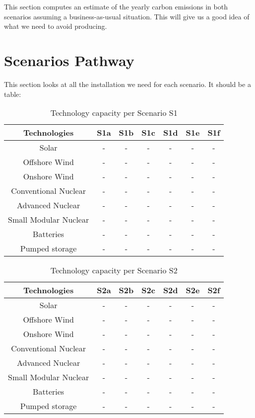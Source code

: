 This section computes an estimate of the yearly carbon emissions in both scenarios assuming a business-as-usual situation. This will give us a good idea of what we need to avoid producing.


\section{Scenarios Pathway}

This section looks at all the installation we need for each scenario. It should be a table:



\begin{table}[ht]
\caption[Technology capacity per Scenario S1]{Technology capacity per Scenario S1}
\begin{tabular}{ c c c c c c c }
	\toprule
	Technologies & S1a & S1b & S1c & S1d & S1e & S1f \\
	\midrule
	Solar & - & - & - & - & - & - \\
	Offshore Wind & - & - & - & - & - & - \\
	Onshore Wind & - & - & - & - & - & - \\
	Conventional Nuclear & - & - & - & - & - & - \\
	Advanced Nuclear & - & - & - & - & - & - \\
	Small Modular Nuclear & - & - & - & - & - & - \\
	Batteries & - & - & - & - & - & - \\
	Pumped storage & - & - & - & - & - & - \\
	\bottomrule
\end{tabular}
\end{table}


\begin{table}[ht]
\caption[Technology capacity per Scenario S2]{Technology capacity per Scenario S2}
\begin{tabular}{ c c c c c c c }
	\toprule
	Technologies & S2a & S2b & S2c & S2d & S2e & S2f \\
	\midrule
	Solar & - & - & - & - & - & - \\
	Offshore Wind & - & - & - & - & - & - \\
	Onshore Wind & - & - & - & - & - & - \\
	Conventional Nuclear & - & - & - & - & - & - \\
	Advanced Nuclear & - & - & - & - & - & - \\
	Small Modular Nuclear & - & - & - & - & - & - \\
	Batteries & - & - & - & - & - & - \\
	Pumped storage & - & - & - & - & - & - \\
	\bottomrule
\end{tabular}
\end{table}



